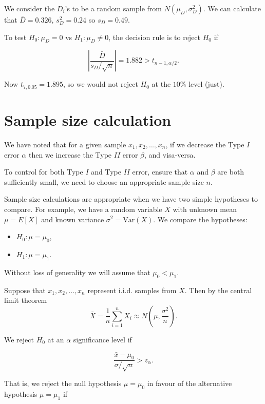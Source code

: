 \documentclass[
]{book}
\providecommand{\tightlist}{%
  \setlength{\itemsep}{0pt}\setlength{\parskip}{0pt}}
\begin{document}
We consider the \(D_i\)'s to be a random sample from \(N(\mu_D, \sigma_D^2)\). We can calculate that \(\bar{D} = 0.326\), \(s_D^2 = 0.24\) so \(s_D = 0.49\).

To test \(H_0: \mu_D = 0\) vs \(H_1: \mu_D \neq 0\), the decision rule is to reject \(H_0\) if

\[\left| \frac{\bar{D}}{s_D/\sqrt{n}} \right| = 1.882 > t_{n-1, \alpha/2}.\]

Now \(t_{7,0.05} = 1.895\), so we would not reject \(H_0\) at the \(10\%\) level (just).

\hypertarget{Sec_Hypo_Test:samplesize}{%
\section{Sample size calculation}\label{Sec_Hypo_Test:samplesize}}

We have noted that for a given sample \(x_1, x_2,\ldots, x_n\), if we decrease the Type \(I\) error \(\alpha\) then we increase the Type \(II\) error \(\beta\), and visa-versa.

To control for both Type \(I\) and Type \(II\) error, ensure that \(\alpha\) and \(\beta\) are both sufficiently small, we need to choose an appropriate sample size \(n\).

Sample size calculations are appropriate when we have two simple hypotheses to compare. For example, we have a random variable \(X\) with unknown mean \(\mu = E[X]\) and known variance \(\sigma^2 = \text{Var} (X)\). We compare the hypotheses:

\begin{itemize}
\tightlist
\item
  \(H_0: \mu = \mu_0\),\\
\item
  \(H_1: \mu = \mu_1\).
\end{itemize}

Without loss of generality we will assume that \(\mu_0 < \mu_1\).

Suppose that \(x_1, x_2, \ldots, x_n\) represent i.i.d. samples from \(X\). Then by the central limit theorem\\

\[ \bar{X}= \frac{1}{n} \sum_{i=1}^n X_i \approx N \left( \mu, \frac{\sigma^2}{n} \right). \]

We reject \(H_0\) at an \(\alpha\) significance level if

\[ \frac{\bar{x} - \mu_0}{\sigma/\sqrt{n}} > z_{\alpha}. \]

That is, we reject the null hypothesis \(\mu =\mu_0\) in favour of the alternative hypothesis \(\mu = \mu_1\) if
\end{document}
